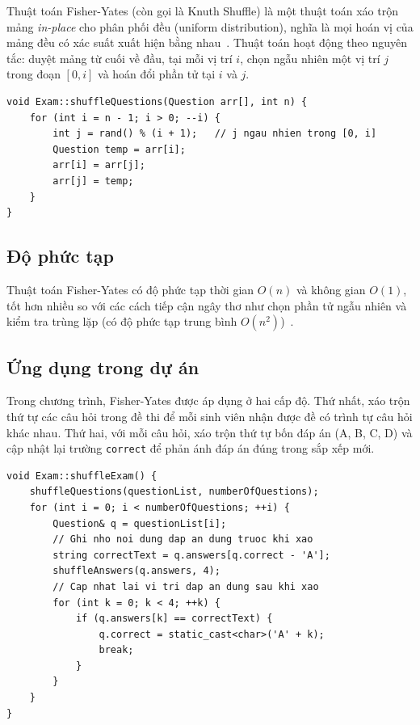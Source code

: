 \documentclass[11pt]{report}
\begin{document}
Thuật toán Fisher-Yates (còn gọi là Knuth Shuffle) là một thuật toán xáo trộn mảng \textit{in-place} cho phân phối đều (uniform distribution), nghĩa là mọi hoán vị của mảng đều có xác suất xuất hiện bằng nhau~\cite{knuth1997}. Thuật toán hoạt động theo nguyên tắc: duyệt mảng từ cuối về đầu, tại mỗi vị trí $i$, chọn ngẫu nhiên một vị trí $j$ trong đoạn $[0, i]$ và hoán đổi phần tử tại $i$ và $j$.

\begin{lstlisting}[caption={Thuật toán Fisher-Yates xáo trộn mảng câu hỏi}, label={lst:fisheryates}]
void Exam::shuffleQuestions(Question arr[], int n) {
    for (int i = n - 1; i > 0; --i) {
        int j = rand() % (i + 1);   // j ngau nhien trong [0, i]
        Question temp = arr[i];
        arr[i] = arr[j];
        arr[j] = temp;
    }
}
\end{lstlisting}

\subsection{Độ phức tạp}

Thuật toán Fisher-Yates có độ phức tạp thời gian $O(n)$ và không gian $O(1)$, tốt hơn nhiều so với các cách tiếp cận ngây thơ như chọn phần tử ngẫu nhiên và kiểm tra trùng lặp (có độ phức tạp trung bình $O(n^2)$)~\cite{knuth1997}.

\subsection{Ứng dụng trong dự án}

Trong chương trình, Fisher-Yates được áp dụng ở hai cấp độ. Thứ nhất, xáo trộn thứ tự các câu hỏi trong đề thi để mỗi sinh viên nhận được đề có trình tự câu hỏi khác nhau. Thứ hai, với mỗi câu hỏi, xáo trộn thứ tự bốn đáp án (A, B, C, D) và cập nhật lại trường \texttt{correct} để phản ánh đáp án đúng trong sắp xếp mới.

\begin{lstlisting}[caption={Xáo trộn đáp án và cập nhật đáp án đúng}, label={lst:shuffleans}]
void Exam::shuffleExam() {
    shuffleQuestions(questionList, numberOfQuestions);
    for (int i = 0; i < numberOfQuestions; ++i) {
        Question& q = questionList[i];
        // Ghi nho noi dung dap an dung truoc khi xao
        string correctText = q.answers[q.correct - 'A'];
        shuffleAnswers(q.answers, 4);
        // Cap nhat lai vi tri dap an dung sau khi xao
        for (int k = 0; k < 4; ++k) {
            if (q.answers[k] == correctText) {
                q.correct = static_cast<char>('A' + k);
                break;
            }
        }
    }
}
\end{lstlisting}
\end{document}
